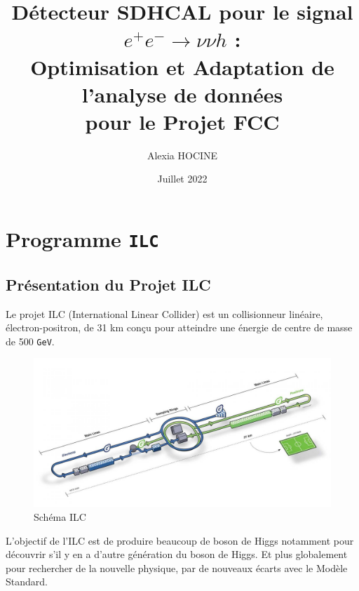\documentclass[10pt,a4paper]{report}
\author{Alexia \textsc{HOCINE}}
\title{Détecteur SDHCAL pour le signal  $ e^{+} e^{-} \longrightarrow \nu \nu h $ :\\Optimisation et Adaptation de l'analyse de données\\pour le Projet FCC 
}
\date{Juillet 2022}
\newcommand{\MS}{Modèle Standard\xspace}
\newcommand{\GeV}{\texttt{GeV}}
\begin{document}






\tableofcontents







\chapter{Programme \texttt{ILC}}

\section{Présentation du Projet ILC}

Le projet ILC (International Linear Collider) est un collisionneur linéaire, électron-positron, de 31 km conçu pour atteindre une énergie de centre de masse de 500 \GeV \cite{cern:ilc}. \\

\begin{figure}[h!]
	\center
	\includegraphics[width=\textwidth]{../img/ilc.jpg} 
	\caption{Schéma ILC\cite{cern:ilc}}
	\label{ilc:schema}
\end{figure}

L'objectif de l'ILC est de produire beaucoup de boson de Higgs notamment pour découvrir s'il y en a d'autre génération du boson de Higgs. Et plus globalement pour rechercher de la nouvelle physique, par de nouveaux écarts avec le \MS.\\
\end{document}
